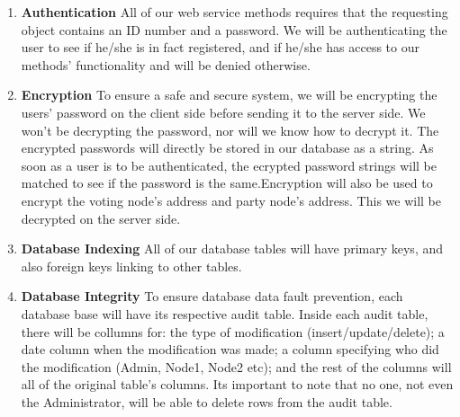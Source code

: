 \begin{enumerate}
		\item\textbf{Authentication}\newline
		All of our web service methods requires that the requesting object contains an ID number and a password. We will be authenticating the user to see if he/she is in fact registered, and if he/she has access to our methods' functionality and will be denied otherwise.
		
		\item\textbf{Encryption}\newline
		To ensure a safe and secure system, we will be encrypting the users' password on the client side before sending it to the server side. We won't be decrypting the password, nor will we know how to decrypt it. The encrypted passwords will directly be stored in our database as a string. As soon as a user is to be authenticated, the ecrypted password strings will be matched to see if the password is the same.\newline Encryption will also be used to encrypt the voting node's address and party node's address. This we will be decrypted on the server side.
		
		\item\textbf{Database Indexing}\newline
		All of our database tables will have primary keys, and also foreign keys linking to other tables.
		
		\item\textbf{Database Integrity}\newline
		To ensure database data fault prevention, each database base will have its respective audit table. Inside each audit table, there will be collumns for: the type of modification (insert/update/delete); a date column when the modification was made; a column specifying who did the modification (Admin, Node1, Node2 etc); and the rest of the columns will all of the original table's columns. Its important to note that no one, not even the Administrator, will be able to delete rows from the audit table.
\end{enumerate}	